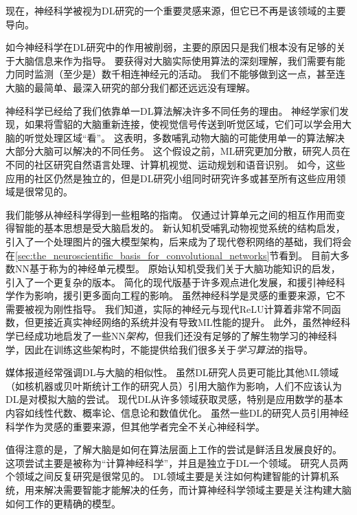 现在，神经科学被视为\gls{DL}研究的一个重要灵感来源，但它已不再是该领域的主要导向。


如今神经科学在\gls{DL}研究中的作用被削弱，主要的原因只是我们根本没有足够的关于大脑信息来作为指导。
要获得对大脑实际使用算法的深刻理解，我们需要有能力同时监测（至少是）数千相连神经元的活动。
我们不能够做到这一点，甚至连大脑的最简单、最深入研究的部分我们都还远远没有理解\citep{olshausen:2005}。

神经科学已经给了我们依靠单一\gls{DL}算法解决许多不同任务的理由。
神经学家们发现，如果将雪貂的大脑重新连接，使视觉信号传送到听觉区域，它们可以学会用大脑的听觉处理区域``看''\citep{von2000visual}。
这表明，多数哺乳动物大脑的可能使用单一的算法解决大部分大脑可以解决的不同任务。
这个假设之前，\gls{ML}研究更加分散，研究人员在不同的社区研究自然语言处理、计算机视觉、运动规划和语音识别。
如今，这些应用的社区仍然是独立的，但是\gls{DL}研究小组同时研究许多或甚至所有这些应用领域是很常见的。

我们能够从神经科学得到一些粗略的指南。
仅通过计算单元之间的相互作用而变得智能的基本思想是受大脑启发的。
新认知机\citep{Fukushima80}受哺乳动物视觉系统的结构启发，引入了一个处理图片的强大模型架构，后来成为了现代卷积网络的基础\citep{LeCun98-small}，我们将会在\ref{sec:the_neuroscientific_basis_for_convolutional_networks}节看到。
目前大多数\gls{NN}基于称为的神经单元模型。
原始认知机\citep{Fukushima75}受我们关于大脑功能知识的启发， 引入了一个更复杂的版本。
简化的现代版基于许多观点进化发展，\citet{Nair-2010}和\citet{Glorot+al-AI-2011-small}援引神经科学作为影响，\citet{Jarrett-ICCV2009}援引更多面向工程的影响。
虽然神经科学是灵感的重要来源，它不需要被视为刚性指导。
我们知道，实际的神经元与现代\gls{ReLU}计算着非常不同函数，但更接近真实神经网络的系统并没有导致\gls{ML}性能的提升。
此外，虽然神经科学已经成功地启发了一些\gls{NN}\emph{架构}，但我们还没有足够的了解生物学习的神经科学，因此在训练这些架构时，不能提供给我们很多关于\emph{学习算法}的指导。

媒体报道经常强调\gls{DL}与大脑的相似性。
虽然\gls{DL}研究人员更可能比其他\gls{ML}领域（如核机器或贝叶斯统计工作的研究人员）引用大脑作为影响，人们不应该认为\gls{DL}是对模拟大脑的尝试。
现代\gls{DL}从许多领域获取灵感，特别是应用数学的基本内容如线性代数、概率论、信息论和数值优化。
虽然一些\gls{DL}的研究人员引用神经科学作为灵感的重要来源，但其他学者完全不关心神经科学。


值得注意的是，了解大脑是如何在算法层面上工作的尝试是鲜活且发展良好的。
这项尝试主要是被称为``计算神经科学''，并且是独立于\gls{DL}一个领域。
研究人员两个领域之间反复研究是很常见的。
\gls{DL}领域主要是关注如何构建智能的计算机系统，用来解决需要智能才能解决的任务，而计算神经科学领域主要是关注构建大脑如何工作的更精确的模型。

